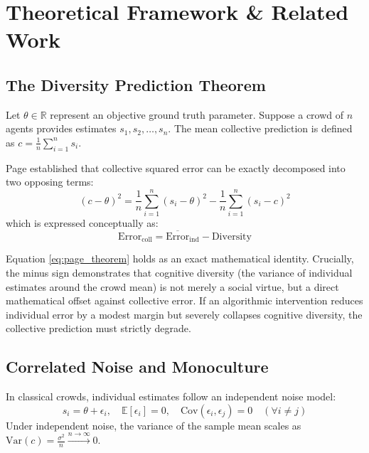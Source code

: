 \documentclass[10pt,twocolumn]{article}
\begin{document}
\section{Theoretical Framework \& Related Work}

\subsection{The Diversity Prediction Theorem}
Let $\theta \in \mathbb{R}$ represent an objective ground truth parameter. Suppose a crowd of $n$ agents provides estimates $s_1, s_2, \dots, s_n$. The mean collective prediction is defined as $c = \frac{1}{n} \sum_{i=1}^n s_i$. 

Page \cite{page2007difference} established that collective squared error can be exactly decomposed into two opposing terms:
\begin{equation}
(c - \theta)^2 = \frac{1}{n} \sum_{i=1}^n (s_i - \theta)^2 - \frac{1}{n} \sum_{i=1}^n (s_i - c)^2
\label{eq:page_theorem}
\end{equation}
which is expressed conceptually as:
\begin{equation}
\mathrm{Error}_{\mathrm{coll}} = \overline{\mathrm{Error}}_{\mathrm{ind}} - \mathrm{Diversity}
\end{equation}

Equation \ref{eq:page_theorem} holds as an exact mathematical identity. Crucially, the minus sign demonstrates that cognitive diversity (the variance of individual estimates around the crowd mean) is not merely a social virtue, but a direct mathematical offset against collective error. If an algorithmic intervention reduces individual error by a modest margin but severely collapses cognitive diversity, the collective prediction must strictly degrade.

\subsection{Correlated Noise and Monoculture}
In classical crowds, individual estimates follow an independent noise model:
\begin{equation}
s_i = \theta + \epsilon_i, \quad \mathbb{E}[\epsilon_i] = 0, \quad \text{Cov}(\epsilon_i, \epsilon_j) = 0 \quad (\forall i \neq j)
\end{equation}
Under independent noise, the variance of the sample mean scales as $\text{Var}(c) = \frac{\sigma^2}{n} \xrightarrow{n \to \infty} 0$. 
\end{document}
